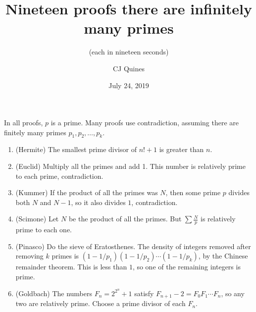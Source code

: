 \documentclass[11pt,paper=letter]{scrartcl}
\begin{document}
\title{Nineteen proofs there are infinitely many primes}
\subtitle{(each in nineteen seconds)}
\author{CJ Quines}
\date{July 24, 2019}

\maketitle

In all proofs, $p$ is a prime. Many proofs use contradiction, assuming there are finitely many primes $p_1, p_2, \ldots, p_k$.

\begin{enumerate}

\item (Hermite) The smallest prime divisor of $n! + 1$ is greater than $n$.

\item (Euclid) Multiply all the primes and add 1. This number is relatively prime to each prime, contradiction.

\item (Kummer) If the product of all the primes was $N$, then some prime $p$ divides both $N$ and $N-1$, so it also divides $1$, contradiction.

\item (Scimone) Let $N$ be the product of all the primes. But $\sum \frac Np$ is relatively prime to each one.



\item (Pinasco) Do the sieve of Eratosthenes. The density of integers removed after removing $k$ primes is $(1 - 1/p_1)(1 - 1/p_2)\cdots(1 - 1/p_k)$, by the Chinese remainder theorem. This is less than $1$, so one of the remaining integers is prime.

\item (Goldbach) The numbers $F_n = 2^{2^n} + 1$ satisfy $F_{n+1} - 2 = F_0F_1 \cdots F_n$, so any two are relatively prime. Choose a prime divisor of each $F_n$.


\end{enumerate}
\end{document}
